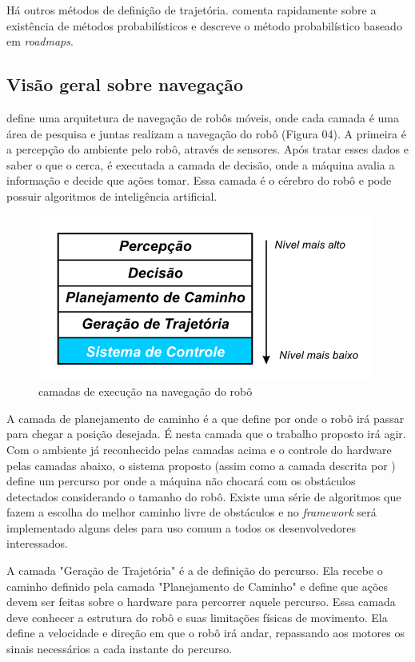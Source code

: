Há outros métodos de definição de trajetória. \cite{Guzman2008} comenta rapidamente sobre a existência de métodos probabilísticos e \cite{Strandberg2004} descreve o método probabilístico baseado em \textit{roadmaps}.

\subsection{Visão geral sobre navegação}

\cite{Vieira2005} define uma arquitetura de navegação de robôs móveis, onde cada camada é uma área de pesquisa e juntas realizam a navegação do robô (Figura 04). A primeira é a percepção do ambiente pelo robô, através de sensores. Após tratar esses dados e saber o que o cerca, é executada a camada de decisão, onde a máquina avalia a informação e decide que ações tomar. Essa camada é o cérebro do robô e pode possuir algoritmos de inteligência artificial.

\begin{figure}[h]
	\centering
	\label{fig04}
		\includegraphics[keepaspectratio=true,scale=1]{figuras/arqRoboMoveis0.png}
	\caption{camadas de execução na navegação do robô \cite{Vieira2005}}
\end{figure}

A camada de planejamento de caminho é a que define por onde o robô irá passar para chegar a posição desejada. É nesta camada que o trabalho proposto irá agir. Com o ambiente já reconhecido pelas camadas acima e o controle do hardware pelas camadas abaixo, o sistema proposto (assim como a camada descrita por \cite{Vieira2005}) define um percurso por onde a máquina não chocará com os obstáculos detectados considerando o tamanho do robô. Existe uma série de algoritmos que fazem a  escolha do melhor caminho livre de obstáculos e no \textit{framework} será implementado alguns deles para uso comum a todos os desenvolvedores interessados.

A camada "Geração de Trajetória" é a de definição do percurso. Ela recebe o caminho definido pela camada "Planejamento de Caminho" e define que ações devem ser feitas sobre o hardware para percorrer aquele percurso. Essa camada deve conhecer a estrutura do robô e suas limitações físicas de movimento. Ela define a velocidade e direção em que o robô irá andar, repassando aos motores os sinais necessários a cada instante do percurso. 

